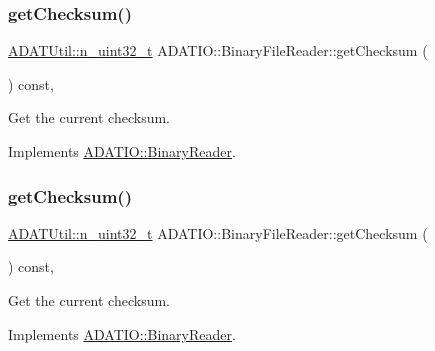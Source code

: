 \subsubsection{\texorpdfstring{getChecksum()}{getChecksum()}\hspace{0.1cm}{\footnotesize\ttfamily [1/2]}}
{\footnotesize\ttfamily \mbox{\hyperlink{namespaceADATUtil_ad945a8afa4db2d1f89b731964adae97e}{A\+D\+A\+T\+Util\+::n\+\_\+uint32\+\_\+t}} A\+D\+A\+T\+I\+O\+::\+Binary\+File\+Reader\+::get\+Checksum (\begin{DoxyParamCaption}{ }\end{DoxyParamCaption}) const\hspace{0.3cm}{\ttfamily [inline]}, {\ttfamily [virtual]}}



Get the current checksum. 



Implements \mbox{\hyperlink{classADATIO_1_1BinaryReader_acd705bb96d557a5437410b55beb40bda}{A\+D\+A\+T\+I\+O\+::\+Binary\+Reader}}.

\mbox{\label{classADATIO_1_1BinaryFileReader_addb0cfdf4c3df174327b1abc136cfc68}} 
\subsubsection{\texorpdfstring{getChecksum()}{getChecksum()}\hspace{0.1cm}{\footnotesize\ttfamily [2/2]}}
{\footnotesize\ttfamily \mbox{\hyperlink{namespaceADATUtil_ad945a8afa4db2d1f89b731964adae97e}{A\+D\+A\+T\+Util\+::n\+\_\+uint32\+\_\+t}} A\+D\+A\+T\+I\+O\+::\+Binary\+File\+Reader\+::get\+Checksum (\begin{DoxyParamCaption}{ }\end{DoxyParamCaption}) const\hspace{0.3cm}{\ttfamily [inline]}, {\ttfamily [virtual]}}



Get the current checksum. 



Implements \mbox{\hyperlink{classADATIO_1_1BinaryReader_acd705bb96d557a5437410b55beb40bda}{A\+D\+A\+T\+I\+O\+::\+Binary\+Reader}}.

\mbox{\label{classADATIO_1_1BinaryFileReader_ae0985a1157f9baa87580606cfcf98908}} 
